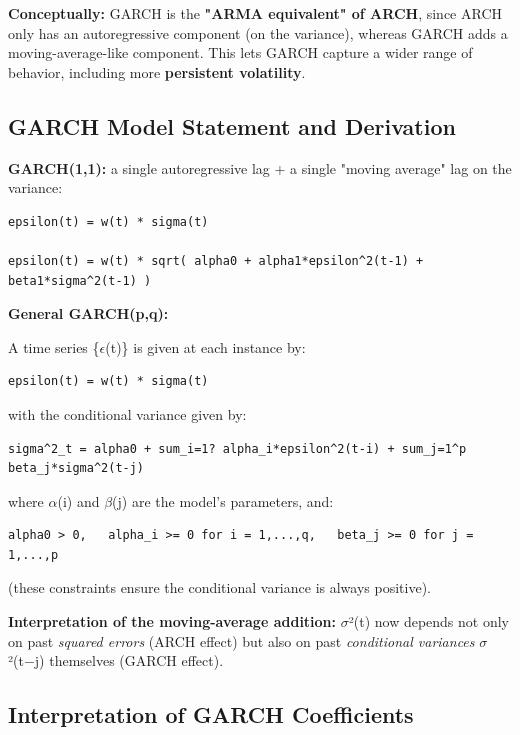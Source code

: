 \documentclass[12pt,openany]{book}
\theoremstyle{definition}
\theoremstyle{remark}
\begin{document}
\textbf{Conceptually:} GARCH is the \textbf{"ARMA equivalent" of ARCH}, since ARCH only has an autoregressive component (on the variance), whereas GARCH adds a moving-average-like component. This lets GARCH capture a wider range of behavior, including more \textbf{persistent volatility}.

\subsection{GARCH Model Statement and Derivation}

\textbf{GARCH(1,1):} a single autoregressive lag + a single "moving average" lag on the variance:

\begin{lstlisting}[style=notesCode]
epsilon(t) = w(t) * sigma(t)

epsilon(t) = w(t) * sqrt( alpha0 + alpha1*epsilon^2(t-1) + beta1*sigma^2(t-1) )
\end{lstlisting}

\textbf{General GARCH(p,q):}

A time series \{\ensuremath{\epsilon}(t)\} is given at each instance by:

\begin{lstlisting}[style=notesCode]
epsilon(t) = w(t) * sigma(t)
\end{lstlisting}

with the conditional variance given by:

\begin{lstlisting}[style=notesCode]
sigma^2_t = alpha0 + sum_i=1? alpha_i*epsilon^2(t-i) + sum_j=1^p beta_j*sigma^2(t-j)
\end{lstlisting}

where \ensuremath{\alpha}(i) and \ensuremath{\beta}(j) are the model's parameters, and:

\begin{lstlisting}[style=notesCode]
alpha0 > 0,   alpha_i >= 0 for i = 1,...,q,   beta_j >= 0 for j = 1,...,p
\end{lstlisting}

(these constraints ensure the conditional variance is always positive).

\textbf{Interpretation of the moving-average addition:} \ensuremath{\sigma}²(t) now depends not only on past \emph{squared errors} (ARCH effect) but also on past \emph{conditional variances} \ensuremath{\sigma}²(t−j) themselves (GARCH effect).

\subsection{Interpretation of GARCH Coefficients}
\end{document}
